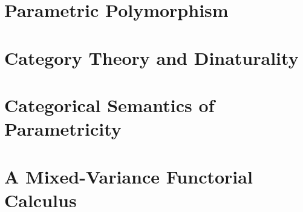 \documentclass[../Dissertation.tex]{subfiles}
\begin{document}
\section{Parametric Polymorphism}\label{sec:category}

\newpage

\section{Category Theory and Dinaturality}

\newpage

\section{Categorical Semantics of Parametricity}

\newpage

\section{A Mixed-Variance Functorial Calculus}

\end{document}
